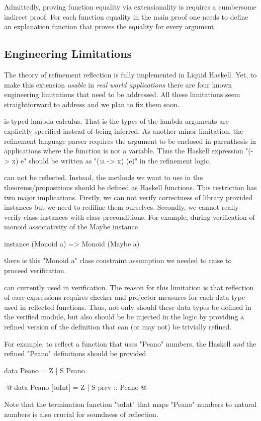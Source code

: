 Admittedly, proving function equality via extensionality
is requires a cumbersome indirect proof.
%
For each function equality in the main proof
one needs to define an explanation function
that proves the equality for every argument.


\subsection{Engineering Limitations}
The theory of refinement reflection is fully implemented in Liquid Haskell.
%
Yet, to make this extension \textit{usable} in \textit{real world applications}
there are four known engineering limitations that need to be addressed.
%
All these limitations seem straightforward to address
and we plan to fix them soon.

is typed lambda calculus. That is the types of the lambda arguments are
explicitly specified
instead of being inferred.
%
As another minor limitation, the refinement language parser
requires the argument to be enclosed in parenthesis
in applications where the function is not a variable.
%
Thus the Haskell expression
"(\x -> x) e" should be written as "(\x:a -> x) (e)"
in the refinement logic,

 can not be reflected.
%
Instead, the methods we want to use in the theorems/propositions
should be defined as Haskell functions.
%
This restriction has two major implications.
%
Firstly, we can not verify correctness of library provided
instances but we need to redifine them ourselves.
%
Secondly, we cannot really verify class instances with class preconditions.
%
For example, during verification of monoid associativity of the Maybe instance
\begin{code}
  instance (Monoid a) => Monoid (Maybe a)
\end{code}
%
there is this "Monoid a" class constraint assumption we needed to raise to
proceed verification.

can currently used in verification.
%
The reason for this limitation is that
reflection of case expressions
requires checker and projector measures for each
data type used in reflected functions.
%
Thus, not only should these data types be defined in
the verified module, but also should be
be injected in the logic by providing a refined version of
the definition that can (or may not) be trivially refined.

For example, to reflect a function that uses
"Peano" numbers, the Haskell \textit{and} the refined "Peano"
definitions should be provided
%
\begin{code}
data Peano = Z | S Peano

{-@ data Peano [toInt]
     = Z
     | S {prev :: Peano}
  @-}
\end{code}
%
Note that the termination function "toInt"
that maps "Peano" numbers to natural numbers
is also crucial for soundness of reflection.

